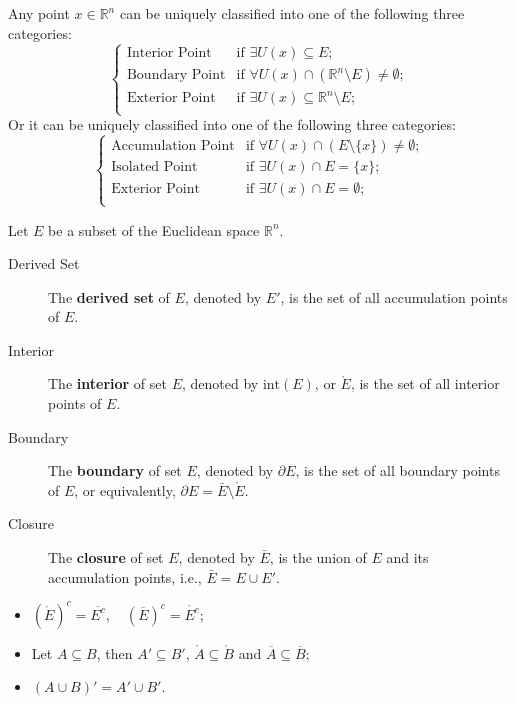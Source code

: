 Any point \(x \in \mathbb{R}^n\) can be uniquely classified into one of the following three categories:
\[
\begin{cases}
\text{Interior Point} & \text{if } \exists U(x) \subseteq E; \\
\text{Boundary Point} & \text{if } \forall U(x) \cap (\mathbb{R}^n \setminus E) \neq \emptyset; \\
\text{Exterior Point} & \text{if } \exists U(x) \subseteq \mathbb{R}^n \setminus E; \\
\end{cases}
\]
Or it can be uniquely classified into one of the following three categories:
\[
\begin{cases}
\text{Accumulation Point} & \text{if } \forall U(x) \cap (E \setminus \{x\}) \neq \emptyset; \\
\text{Isolated Point} & \text{if } \exists U(x) \cap E = \{x\}; \\
\text{Exterior Point} & \text{if } \exists U(x) \cap E = \emptyset; \\
\end{cases}
\]

\begin{definition}
    Let \(E\) be a subset of the Euclidean space \(\mathbb{R}^n\).
    \begin{description}
        \item[Derived Set] The \textbf{derived set} of \(E\), denoted by \(E'\), 
            is the set of all accumulation points of \(E\).
        \item[Interior] The \textbf{interior} of set \(E\), denoted by \(\mathrm{int}(E)\), or \(\mathring{E}\), 
            is the set of all interior points of \(E\).
        \item[Boundary] The \textbf{boundary} of set \(E\), denoted by \(\partial E\), 
            is the set of all boundary points of \(E\), or equivalently, \(\partial E = \bar{E} \setminus \mathring{E}\).
        \item[Closure] The \textbf{closure} of set \(E\), denoted by \(\bar{E}\), 
            is the union of \(E\) and its accumulation points, i.e., \(\bar{E} = E \cup E'\).
    \end{description}
\end{definition}

\begin{property}
    \begin{itemize}
        \item \(\left( \mathring{E} \right)^{c}  = \overline{E^c},\quad \left( \overline{E} \right)^{c} = \mathring{E^c}\);
        \item Let \(A \subseteq B\), then \(A' \subseteq B'\), \(\mathring{A} \subseteq \mathring{B}\) 
            and \(\overline{A} \subseteq \overline{B}\);
        \item \((A \cup B)' = A' \cup B'\).
    \end{itemize}
\end{property}



